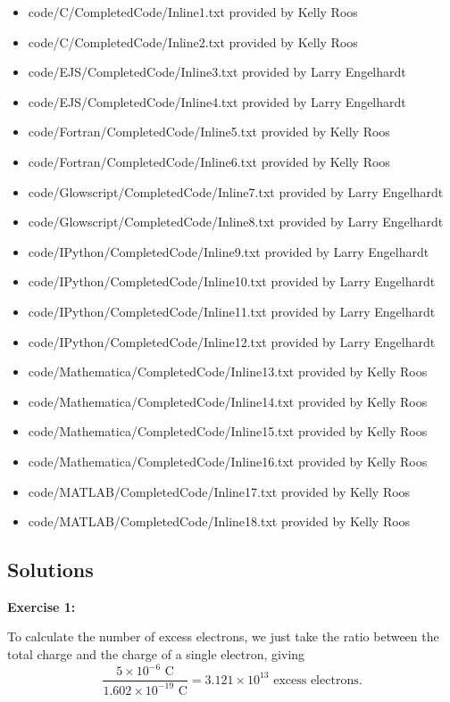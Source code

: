 \documentclass[]{article}
\providecommand{\tightlist}{%
  \setlength{\itemsep}{0pt}\setlength{\parskip}{0pt}}
\begin{document}
\begin{itemize}
\tightlist
\item
  code/C/CompletedCode/Inline1.txt provided by Kelly Roos
\item
  code/C/CompletedCode/Inline2.txt provided by Kelly Roos
\item
  code/EJS/CompletedCode/Inline3.txt provided by Larry Engelhardt
\item
  code/EJS/CompletedCode/Inline4.txt provided by Larry Engelhardt
\item
  code/Fortran/CompletedCode/Inline5.txt provided by Kelly Roos
\item
  code/Fortran/CompletedCode/Inline6.txt provided by Kelly Roos
\item
  code/Glowscript/CompletedCode/Inline7.txt provided by Larry Engelhardt
\item
  code/Glowscript/CompletedCode/Inline8.txt provided by Larry Engelhardt
\item
  code/IPython/CompletedCode/Inline9.txt provided by Larry Engelhardt
\item
  code/IPython/CompletedCode/Inline10.txt provided by Larry Engelhardt
\item
  code/IPython/CompletedCode/Inline11.txt provided by Larry Engelhardt
\item
  code/IPython/CompletedCode/Inline12.txt provided by Larry Engelhardt
\item
  code/Mathematica/CompletedCode/Inline13.txt provided by Kelly Roos
\item
  code/Mathematica/CompletedCode/Inline14.txt provided by Kelly Roos
\item
  code/Mathematica/CompletedCode/Inline15.txt provided by Kelly Roos
\item
  code/Mathematica/CompletedCode/Inline16.txt provided by Kelly Roos
\item
  code/MATLAB/CompletedCode/Inline17.txt provided by Kelly Roos
\item
  code/MATLAB/CompletedCode/Inline18.txt provided by Kelly Roos
\end{itemize}

\subsection{Solutions}\label{solutions}

\textbf{Exercise 1:}

To calculate the number of excess electrons, we just take the ratio
between the total charge and the charge of a single electron, giving
\[\frac{5\times 10^{-6}\textrm{ C}}{1.602\times 10^{-19}\textrm{ C}}=3.121\times 10^{13}\textrm{ excess electrons}.\]
\end{document}
